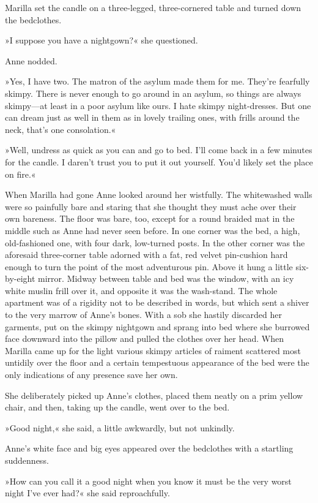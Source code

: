 Marilla set the candle on a three-legged, three-cornered table and turned down the bedclothes.

»I suppose you have a nightgown?« she questioned.

Anne nodded.

»Yes, I have two. The matron of the asylum made them for me. They’re fearfully skimpy. There is never enough to go around in an asylum, so things are always skimpy—at least in a poor asylum like ours. I hate skimpy night-dresses. But one can dream just as well in them as in lovely trailing ones, with frills around the neck, that’s one consolation.«

»Well, undress as quick as you can and go to bed. I’ll come back in a few minutes for the candle. I daren’t trust you to put it out yourself. You’d likely set the place on fire.«

When Marilla had gone Anne looked around her wistfully. The whitewashed walls were so painfully bare and staring that she thought they must ache over their own bareness. The floor was bare, too, except for a round braided mat in the middle such as Anne had never seen before. In one corner was the bed, a high, old-fashioned one, with four dark, low-turned posts. In the other corner was the aforesaid three-corner table adorned with a fat, red velvet pin-cushion hard enough to turn the point of the most adventurous pin. Above it hung a little six-by-eight mirror. Midway between table and bed was the window, with an icy white muslin frill over it, and opposite it was the wash-stand. The whole apartment was of a rigidity not to be described in words, but which sent a shiver to the very marrow of Anne’s bones. With a sob she hastily discarded her garments, put on the skimpy nightgown and sprang into bed where she burrowed face downward into the pillow and pulled the clothes over her head. When Marilla came up for the light various skimpy articles of raiment scattered most untidily over the floor and a certain tempestuous appearance of the bed were the only indications of any presence save her own.

She deliberately picked up Anne’s clothes, placed them neatly on a prim yellow chair, and then, taking up the candle, went over to the bed.

»Good night,« she said, a little awkwardly, but not unkindly.

Anne’s white face and big eyes appeared over the bedclothes with a startling suddenness.

»How can you call it a good night when you know it must be the very worst night I’ve ever had?« she said reproachfully.

